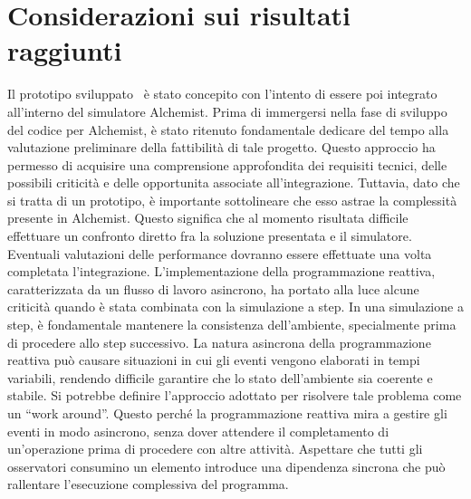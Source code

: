 \documentclass[12pt,a4paper,openright,twoside]{book}
\begin{document}
\section{Considerazioni sui risultati raggiunti}
Il prototipo sviluppato~\cite{https://doi.org/10.5281/zenodo.10718499} è stato concepito con l'intento di essere poi integrato all'interno del simulatore Alchemist. Prima di immergersi nella fase di sviluppo del codice per Alchemist, è stato ritenuto fondamentale dedicare del tempo alla valutazione preliminare della fattibilità di tale progetto. Questo approccio ha permesso di acquisire una comprensione approfondita dei requisiti tecnici, delle possibili criticità e delle opportunita associate all'integrazione. 
Tuttavia, dato che si tratta di un prototipo, è importante sottolineare che esso astrae la complessità presente in Alchemist. Questo significa che al momento risultata difficile effettuare un confronto diretto fra la soluzione presentata e il simulatore. Eventuali valutazioni delle performance dovranno essere effettuate una volta completata l'integrazione. 
L'implementazione della programmazione reattiva, caratterizzata da un flusso di lavoro asincrono, ha portato alla luce alcune criticità quando è stata combinata con la simulazione a step. In una simulazione a step, è fondamentale mantenere la consistenza dell'ambiente, specialmente prima di procedere allo step successivo. La natura asincrona della programmazione reattiva può causare situazioni in cui gli eventi vengono elaborati in tempi variabili, rendendo difficile garantire che lo stato dell'ambiente sia coerente e stabile. Si potrebbe definire l'approccio adottato per risolvere tale problema come un ``work around''. Questo perché la programmazione reattiva mira a gestire gli eventi in modo asincrono, senza dover attendere il completamento di un'operazione prima di procedere con altre attività. Aspettare che tutti gli osservatori consumino un elemento introduce una dipendenza sincrona che può rallentare l'esecuzione complessiva del programma.
\end{document}
